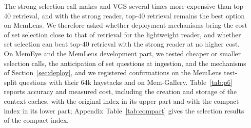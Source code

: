 The strong selection call makes \qss{} and VGS several times more expensive than top-40 retrieval, and with the strong reader, top-40 retrieval remains the best option on MemLens. We therefore asked whether deployment mechanisms bring the cost of set selection close to that of retrieval for the lightweight reader, and whether set selection can beat top-40 retrieval with the strong reader at no higher cost. On MemEye and the MemLens development part, we tested cheaper or smaller selection calls, the anticipation of set questions at ingestion, and the mechanisms of Section~\ref{sec:deploy}, and we registered confirmations on the MemLens test-split questions with their 64k haystacks and on Mem-Gallery. Table~\ref{tab:p6} reports accuracy and measured cost, including the creation and storage of the context caches, with the original index in its upper part and with the compact index in its lower part; Appendix Table~\ref{tab:compact} gives the selection results of the compact index.


